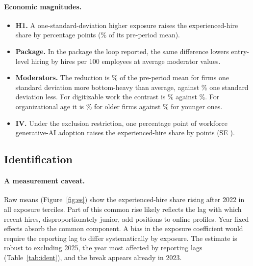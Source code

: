 \documentclass[11pt]{article}
\theoremstyle{remark}\newtheorem{remark}{Remark}
\begin{document}
\paragraph{Economic magnitudes.}
\begin{itemize}
\item \textbf{H1.} A one-standard-deviation higher exposure raises the experienced-hire share by \HoneB percentage points
(\HonePct\% of its pre-period mean).
\item \textbf{Package.} In the package the loop reported, the same difference lowers entry-level hiring by \PkgHoneB hires
per 100 employees at average moderator values.
\item \textbf{Moderators.} The reduction is \PyrHi\% of the pre-period mean for firms one standard deviation more
bottom-heavy than average, against \PyrLo\% one standard deviation less. For digitizable work the contrast is \RemHi\%
against \RemLo\%. For organizational age it is \AgeHi\% for older firms against \AgeLo\% for younger ones.
\item \textbf{IV.} Under the exclusion restriction, one percentage point of workforce generative-AI adoption raises the
experienced-hire share by \IVtiltB points (SE \IVtiltSE).
\end{itemize}

\subsection{Identification}
\paragraph{A measurement caveat.} Raw means (Figure~\ref{fig:es}) show the experienced-hire share rising after 2022 in all
exposure terciles. Part of this common rise likely reflects the lag with which recent hires, disproportionately junior, add
positions to online profiles. Year fixed effects absorb the common component. A bias in the exposure coefficient would require
the reporting lag to differ systematically by exposure. The estimate is robust to excluding 2025, the year most affected by
reporting lags (Table~\ref{tab:ident}), and the break appears already in 2023.




\end{document}
